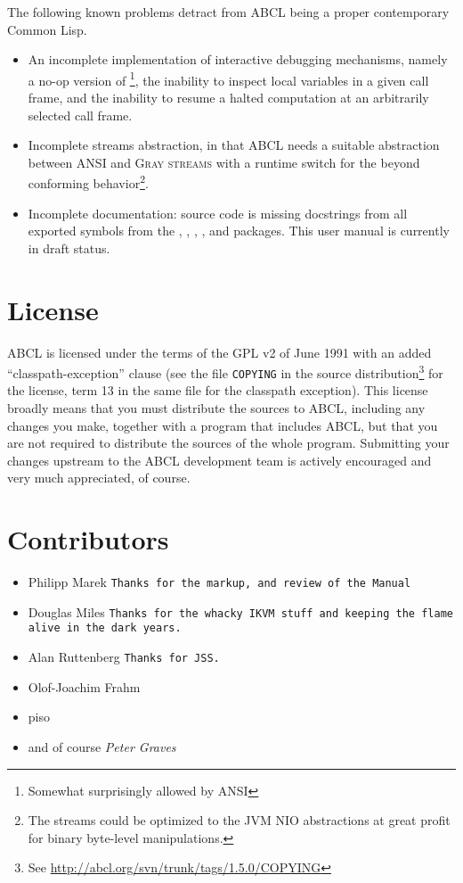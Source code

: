 \documentclass[10pt]{book}
\begin{document}
The following known problems detract from \textsc{ABCL} being a proper
contemporary Common Lisp.
\begin{itemize}
\item An incomplete implementation of interactive debugging
  mechanisms, namely a no-op version of \footnote{Somewhat
    surprisingly allowed by \textsc{ANSI}}, the inability to inspect
  local variables in a given call frame, and the inability to resume a
  halted computation at an arbitrarily selected call frame.
\item Incomplete streams abstraction, in that \textsc{ABCL} needs a
  suitable abstraction between \textsc{ANSI} and \textsc{Gray streams}
  with a runtime switch for the beyond conforming
  behavior\footnote{The streams could be optimized to the
    \textsc{JVM} NIO \cite{nio} abstractions at great profit for
    binary byte-level manipulations.}.
\item Incomplete documentation: source code is missing docstrings from
  all exported symbols from the , ,
  , , and  packages.  This user
  manual is currently in draft status.
\end{itemize}



\section{License}

\textsc{ABCL} is licensed under the terms of the \textsc{GPL} v2 of
June 1991 with an added ``classpath-exception'' clause (see the file
\texttt{COPYING} in the source distribution\footnote{See
  \url{http://abcl.org/svn/trunk/tags/1.5.0/COPYING}} for the license,
term 13 in the same file for the classpath exception).  This license
broadly means that you must distribute the sources to \textsc{ABCL},
including any changes you make, together with a program that includes
\textsc{ABCL}, but that you are not required to distribute the sources
of the whole program.  Submitting your changes upstream to the \textsc{ABCL}
development team is actively encouraged and very much appreciated, of
course.

\section{Contributors}

\begin{itemize}
\item Philipp Marek \texttt{Thanks for the markup, and review of the Manual}
\item Douglas Miles \texttt{Thanks for the whacky IKVM stuff and keeping the flame alive
  in the dark years.}
\item Alan Ruttenberg \texttt{Thanks for JSS.}
\item Olof-Joachim Frahm  
\item piso
\item and of course \emph{Peter Graves}
\end{itemize}
\end{document}
